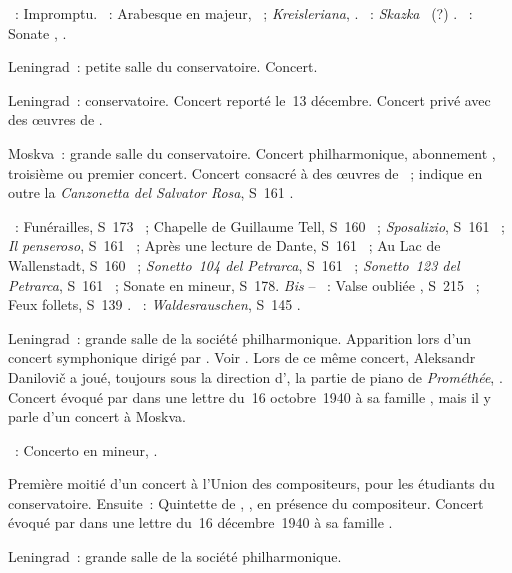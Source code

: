\begin{description}
 \textsc{\Schubert{}}~: Impromptu.
 \textsc{\Schumann{}}~: Arabesque en \kC majeur, ~;
 \emph{Kreisleriana}, .
 \textsc{\Medtner{}}~: \emph{Skazka} ~(?) .
 \textsc{\Scriabine{}}~: Sonate , .
 \item[\DateWithWeekDay{1940-11-25}]
 Leningrad~: petite salle du conservatoire.
 Concert.
 \item[\DateWithWeekDay{1940-11-29}]
 Leningrad~: conservatoire.
 Concert reporté le~13 décembre.
 Concert privé avec des œuvres de \Prokofiev{}.
 \item[\DateWithWeekDay{1940-12-02}]
 Moskva~: grande salle du conservatoire.
 Concert philharmonique, abonnement , troisième
 \citep[p.~417]{Scriabine} ou premier \citep[p.~162]{Nekrasova08} concert.
 Concert consacré à des œuvres de \Liszt{}~; \citeauthor{Nekrasova08}
 indique en outre la \emph{Canzonetta del Salvator Rosa}, S~161 .

 \textsc{\Liszt{}}~: Funérailles, S~173 ~; Chapelle de Guillaume
 Tell, S~160 ~; \emph{Sposalizio}, S~161 ~; \emph{Il
 penseroso}, S~161 ~; Après une lecture de Dante, S~161
 ~; Au Lac de Wallenstadt, S~160 ~; \emph{Sonetto~104
 del Petrarca}, S~161 ~; \emph{Sonetto~123 del Petrarca}, S~161
 ~; Sonate en \kB mineur, S~178.
 \emph{Bis} -- \textsc{\Liszt{}}~: Valse oubliée , S~215
 ~; Feux follets, S~139 .
 \textsc{\Liszt{}}~: \emph{Waldesrauschen}, S~145 .
 \item[\DateWithWeekDay{1940-12-07}]
 Leningrad~: grande salle de la société philharmonique.
 Apparition lors d'un concert symphonique dirigé par \IMiklashevsky{}.
 Voir \citet{Lazarev20}.
 Lors de ce même concert, Aleksandr Danilovič \Kamensky{} a joué, toujours
 sous la direction d'\IMiklashevsky{}, la partie de piano de
 \emph{Prométhée},  \citep[voir aussi][p.~163]{Nekrasova08}.
 Concert évoqué par \VSofronitsky{} dans une lettre du~16 octobre~1940 à sa
 famille \citep[p.~29]{Kogan08}, mais il y parle d'un concert à Moskva.

 \textsc{\Scriabine{}}~: Concerto en \kF \Sharp mineur, .
 \item[\DateWithWeekDay{1940-12-13}]
 Première moitié d'un concert à l'\hbox{Union} des compositeurs, pour les
 étudiants du conservatoire.
 Ensuite~: Quintette de \DChostakovitch{}, , en présence du
 compositeur.
 Concert évoqué par \VSofronitsky{} dans une lettre du~16 décembre~1940 à sa
 famille \citep[p.~30]{Kogan08}.
 \item[\DateWithWeekDay{1940-12-21}]
 Leningrad~: grande salle de la société philharmonique.


\end{description}
